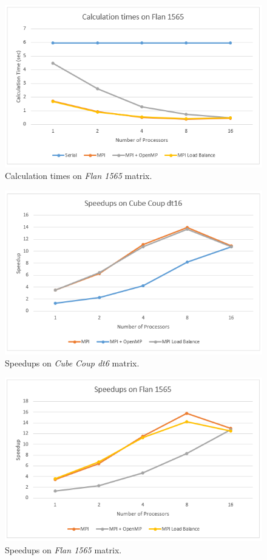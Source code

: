 \documentclass[12pt,reqno]{amsart}
\begin{document}
\begin{figure}[h]
\centering
\includegraphics[width=\linewidth]{calc_flan.png}
\caption{Calculation times on \textit{Flan 1565} matrix.}
\label{fig:calc_flan}
\end{figure}

\begin{figure}[h]
\centering
\includegraphics[width=\linewidth]{speedup_coup.png}
\caption{Speedups on \textit{Cube Coup dt6} matrix.}
\label{fig:speedup_coup}
\end{figure}

\begin{figure}[h]
\centering
\includegraphics[width=\linewidth]{speedup_flan.png}
\caption{Speedups on \textit{Flan 1565} matrix.}
\label{fig:speedup_flan}
\end{figure}
\end{document}
